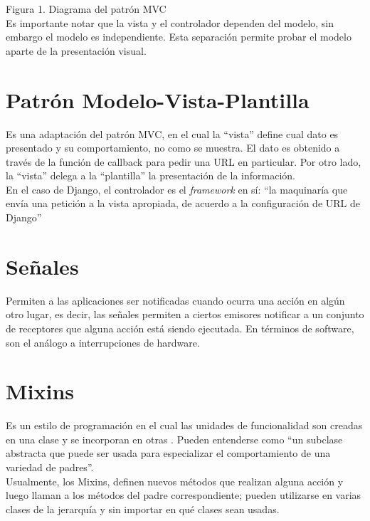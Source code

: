 Figura 1. Diagrama del patrón MVC\\

Es importante notar que la vista y el controlador dependen del modelo, sin embargo el modelo es independiente. Esta separación permite probar el modelo aparte de la presentación visual. 

\section{Patrón Modelo-Vista-Plantilla}

Es una adaptación del patrón MVC, en el cual la “vista” define cual dato es presentado y su comportamiento, no como se muestra. El dato es obtenido a través de la función de callback para pedir una URL en particular. Por otro lado, la “vista” delega a la “plantilla”  la presentación de la información.\\

En el caso de Django, el controlador es el \textit{framework} en sí: “la maquinaría que envía una petición a la vista apropiada, de acuerdo a la configuración de URL de Django” \cite{MVT}

\section{Señales}

Permiten a las aplicaciones ser notificadas cuando ocurra una acción en algún otro lugar, es decir, las señales permiten a ciertos emisores notificar a un conjunto de receptores que alguna acción está siendo ejecutada. \cite{Signals} En términos de software, son el análogo a interrupciones de hardware. \cite{Senales}

\section{Mixins}

Es un estilo de programación en el cual las unidades de funcionalidad son creadas en una clase y se incorporan en otras \cite{Mixins}. Pueden entenderse como “un subclase abstracta que puede ser usada para especializar el comportamiento de una variedad de padres”.  \cite{Mixins2} \\

Usualmente, los Mixins, definen nuevos métodos que realizan alguna acción y luego llaman a los métodos del padre correspondiente; pueden utilizarse en varias clases de la jerarquía y sin importar en qué clases sean usadas. \\

